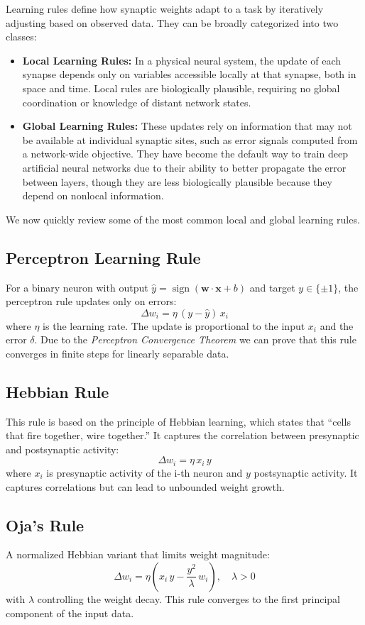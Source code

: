 \documentclass[a4paper,12pt]{report}
\begin{document}
Learning rules define how synaptic weights adapt to a task by iteratively adjusting based on observed data.
They can be broadly categorized into two classes:
\begin{itemize}
\item \textbf{Local Learning Rules:} In a physical neural system, the update of each synapse depends 
only on variables accessible locally at that synapse, both in space and time. \cite[Chapter~7]{Baldi2021}
Local rules are biologically plausible, requiring no global coordination or knowledge of distant 
network states.
\item \textbf{Global Learning Rules:} These updates rely on information that may not be available at 
individual synaptic sites, such as error signals computed from a network-wide objective. They have 
become the default way to train deep artificial neural networks due to their ability to better 
propagate the error between layers, though they are less biologically plausible because they depend on 
nonlocal information.
\end{itemize}

We now quickly review some of the most common local and global learning rules.
\subsection*{Perceptron Learning Rule}
For a binary neuron with output $\hat y=\operatorname{sign}(\mathbf{w}\cdot\mathbf{x}+b)$ and target $y\in\{\pm1\}$, the 
perceptron rule updates only on errors:
\[
  \Delta w_i = \eta\,\left(y - \hat y\right)\,x_i
\]
where $\eta$ is the learning rate. The update is proportional to the input $x_i$ and the error $\delta$.
Due to the \emph{Perceptron Convergence Theorem} we can prove that this rule converges 
in finite steps for linearly separable data.

\subsection*{Hebbian Rule}
This rule is based on the principle of Hebbian learning, which states that ``cells that fire together, 
wire together.''
It captures the correlation between presynaptic and postsynaptic activity:
\[
  \Delta w_i = \eta\,x_i\,y
\]
where $x_i$ is presynaptic activity of the i-th neuron and $y$ postsynaptic activity. It captures 
correlations but can lead to unbounded weight growth.

\subsection*{Oja's Rule}
A normalized Hebbian variant that limits weight magnitude:
\[
  \Delta w_i = \eta \left(x_i\,y - \frac{y^2}{\lambda}\,w_i\right),\quad \lambda>0
\]
with $\lambda$ controlling the weight decay. This rule converges to the first principal component of the
input data.
\end{document}
